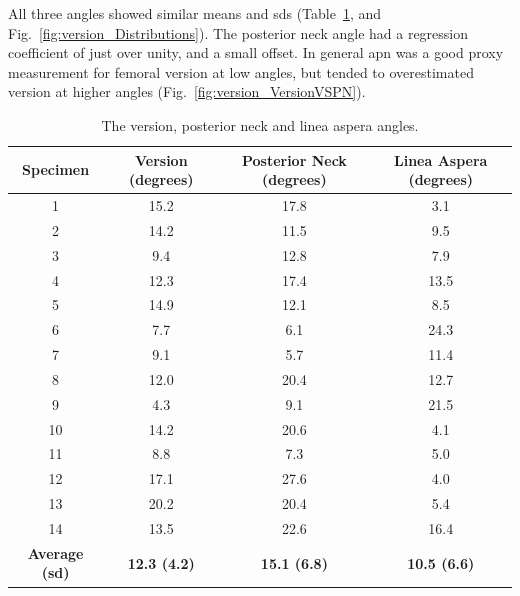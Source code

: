 All three angles showed similar means and \acfp{sd} (Table~\ref{tab:version_results}, and Fig.~\ref{fig:version_Distributions}).
The posterior neck angle had a regression coefficient of just over unity, and a small offset.
In general \ac{apn} was a good proxy measurement for femoral version at low angles, but tended to overestimated version at higher angles (Fig.~\ref{fig:version_VersionVSPN}).

\begin{table}
\centering
\caption[Version and linea aspera data]{The version, posterior neck and linea aspera angles.}
\label{tab:version_results}
\begin{tabular}{c c c c}
	\toprule
	         Specimen          & Version (degrees)   & Posterior Neck (degrees) & Linea Aspera (degrees) \\ \midrule
	            1              & 15.2                & 17.8                     & 3.1                    \\
	            2              & 14.2                & 11.5                     & 9.5                    \\
	            3              & 9.4                 & 12.8                     & 7.9                    \\
	            4              & 12.3                & 17.4                     & 13.5                   \\
	            5              & 14.9                & 12.1                     & 8.5                    \\
	            6              & 7.7                 & 6.1                      & 24.3                   \\
	            7              & 9.1                 & 5.7                      & 11.4                   \\
	            8              & 12.0                & 20.4                     & 12.7                   \\
	            9              & 4.3                 & 9.1                      & 21.5                   \\
	            10             & 14.2                & 20.6                     & 4.1                    \\
	            11             & 8.8                 & 7.3                      & 5.0                    \\
	            12             & 17.1                & 27.6                     & 4.0                    \\
	            13             & 20.2                & 20.4                     & 5.4                    \\
	            14             & 13.5                & 22.6                     & 16.4                   \\
	\textbf{Average (\ac{sd})} & \textbf{12.3 (4.2)} & \textbf{15.1 (6.8)}      & \textbf{10.5 (6.6)}    \\ \bottomrule 
\end{tabular}
\end{table}

